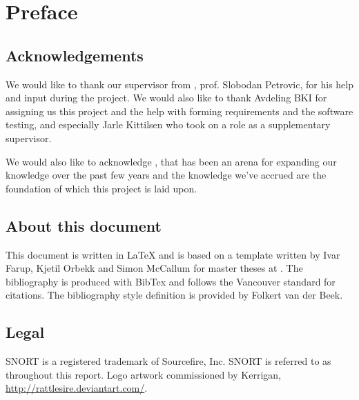\chapter*{Preface}

\section*{Acknowledgements}
We would like to thank our supervisor from \GUC, prof. Slobodan Petrovic, for
his help and input during the project. We would also like to thank Avdeling BKI
for assigning us this project and the help with forming requirements and the
software testing, and especially Jarle Kittilsen who took on a role as a
supplementary supervisor.

We would also like to acknowledge \GUC, that has been an arena for expanding
our knowledge over the past few years and the knowledge we've accrued are the
foundation of which this project is laid upon.

\section*{About this document}
This document is written in LaTeX and is based on a template written by Ivar
Farup, Kjetil Orbekk and Simon McCallum for master theses at \GUC{}.
The bibliography is produced with BibTex and follows the Vancouver standard for citations.
The bibliography style definition is provided by Folkert van der Beek.

\section*{Legal}
SNORT\textregistered{} is a registered trademark of Sourcefire, Inc.
SNORT\textregistered{} is referred to as \snort{} throughout this report.
\newline\newline
Logo artwork commissioned by Kerrigan, \url{http://rattlesire.deviantart.com/}.

\newpage